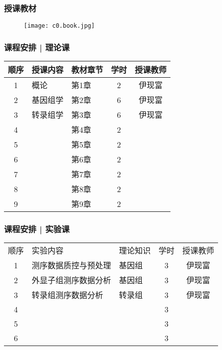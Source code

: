 \begin{frame}
\end{frame}

\begin{frame}
  \frametitle{授课教材}
  \begin{figure}
    \centering
    \texttt{[image: c0.book.jpg]}
  \end{figure}
\end{frame}

\begin{frame}
  \frametitle{课程安排 | 理论课}
  \begin{table}
    \centering
    \begin{tabular}{cllcc}
      \hline
      \rowcolor{blue!50}顺序 & 授课内容 & 教材章节 & 学时 & 授课教师\\
      \hline
      1 & 概论 & 第1章 & 2 & 伊现富\\
      2 & 基因组学 & 第2章 & 6 & 伊现富\\
      3 & 转录组学 & 第3章 & 6 & 伊现富\\
      4 &  & 第4章 & 2 & \\
      5 &  & 第5章 & 2 & \\
      6 &  & 第6章 & 2 & \\
      7 &  & 第7章 & 2 & \\
      8 &  & 第8章 & 2 & \\
      9 &  & 第9章 & 2 & \\
      \hline
    \end{tabular}
  \end{table}
\end{frame}

\begin{frame}
  \frametitle{课程安排 | 实验课}
  \begin{table}
    \centering
    \begin{tabular}{cllcc}
      \hline
      \rowcolor{blue!50}顺序 & 实验内容 & 理论知识 & 学时 & 授课教师\\
      1 & 测序数据质控与预处理 & 基因组 & 3 & 伊现富\\
      2 & 外显子组测序数据分析 & 基因组 & 3 & 伊现富\\
      3 & 转录组测序数据分析 & 转录组 & 3 & 伊现富\\
      4 & & & 3 & \\
      5 & & & 3 & \\
      6 & & & 3 & \\
      \hline
    \end{tabular}
  \end{table}
\end{frame}

